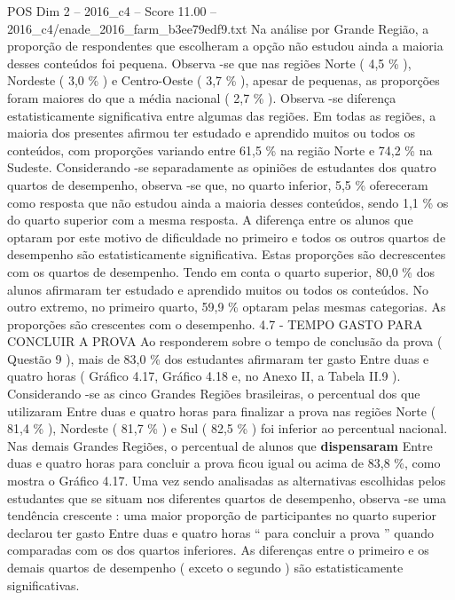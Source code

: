 \begin{textsample}{POS Dim 2 – 2016\_c4 – Score 11.00 – 2016\_c4/enade\_2016\_farm\_b3ee79edf9.txt}
Na análise por Grande Região, a proporção de respondentes que escolheram a opção não estudou ainda a maioria desses conteúdos foi pequena.
Observa -se que nas regiões Norte ( 4,5 \% ), Nordeste ( 3,0 \% ) e Centro-Oeste ( 3,7 \% ), apesar de pequenas, as proporções foram maiores do que a média nacional ( 2,7 \% ).
Observa -se diferença estatisticamente significativa entre algumas das regiões.
Em todas as regiões, a maioria dos presentes afirmou ter estudado e aprendido muitos ou todos os conteúdos, com proporções variando entre 61,5 \% na região Norte e 74,2 \% na Sudeste.
Considerando -se separadamente as opiniões de estudantes dos quatro quartos de desempenho, observa -se que, no quarto inferior, 5,5 \% ofereceram como resposta que não estudou ainda a maioria desses conteúdos, sendo 1,1 \% os do quarto superior com a mesma resposta.
A diferença entre os alunos que optaram por este motivo de dificuldade no primeiro e todos os outros quartos de desempenho são estatisticamente significativa.
Estas proporções são decrescentes com os quartos de desempenho.
Tendo em conta o quarto superior, 80,0 \% dos alunos afirmaram ter estudado e aprendido muitos ou todos os conteúdos.
No outro extremo, no primeiro quarto, 59,9 \% optaram pelas mesmas categorias.
As proporções são crescentes com o desempenho. 4.7 - TEMPO GASTO PARA CONCLUIR A PROVA Ao responderem sobre o tempo de conclusão da prova ( Questão 9 ), mais de 83,0 \% dos estudantes afirmaram ter gasto Entre duas e quatro horas ( Gráfico 4.17, Gráfico 4.18 e, no Anexo II, a Tabela II.9 ).
Considerando -se as cinco Grandes Regiões brasileiras, o percentual dos que utilizaram Entre duas e quatro horas para finalizar a prova nas regiões Norte ( 81,4 \% ), Nordeste ( 81,7 \% ) e Sul ( 82,5 \% ) foi inferior ao percentual nacional.
Nas demais Grandes Regiões, o percentual de alunos que \textbf{dispensaram} Entre duas e quatro horas para concluir a prova ficou igual ou acima de 83,8 \%, como mostra o Gráfico 4.17.
Uma vez sendo analisadas as alternativas escolhidas pelos estudantes que se situam nos diferentes quartos de desempenho, observa -se uma tendência crescente : uma maior proporção de participantes no quarto superior declarou ter gasto Entre duas e quatro horas “ para concluir a prova ” quando comparadas com os dos quartos inferiores.
As diferenças entre o primeiro e os demais quartos de desempenho ( exceto o segundo ) são estatisticamente significativas.

\end{textsample}
